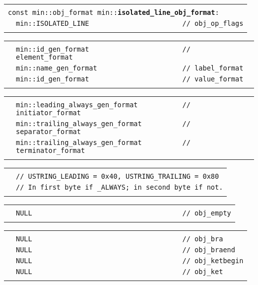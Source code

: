 \documentclass[12pt]{article}
\makeatletter
\newcommand{\TT}[1]{{\tt \bfseries #1}}
\newcommand{\ttindex}[1]{\index{#1@{\tt #1}}}
\newenvironment{indpar}[1][0.3in]%
	{\begin{list}{}%
		     {\setlength{\itemsep}{0in}%
		      \setlength{\topsep}{0in}%
		      \setlength{\parsep}{1ex}%
		      \setlength{\labelwidth}{#1}%
		      \setlength{\leftmargin}{#1}%
		      \addtolength{\leftmargin}{\labelsep}}%
	 \item}%
	{\end{list}}
\newcommand{\LABEL}[1]{\label{#1}}
\newlength{\ARGBREAKLENGTH}
\newcommand{\ARGBREAK}[1][\ARGBREAKLENGTH]{\\&\hspace*{#1}}
\newcommand{\MINKEY}[1]%
	   {\TT{#1}\ttindex{min::#1}\ttindex{#1}}
\makeatother
\begin{document}
\begin{indpar}[1em]
\begin{tabular}{r@{}l}\hspace*{0.1in} \\[-3ex]
\multicolumn{2}{l}{\tt const min::obj\_format
                   min::\MINKEY{isolated\_line\_obj\_format}:}%
\LABEL{MIN::ISOLATED_LINE_OBJ_FORMAT}\ARGBREAK
\verb|min::ISOLATED_LINE                       // obj_op_flags|\ARGBREAK
\end{tabular}

\vspace{-4ex}\begin{tabular}{r@{}l}\hspace*{0.1in}\ARGBREAK
\verb|min::id_gen_format                       // element_format|\ARGBREAK
\verb|min::name_gen_format                     // label_format|\ARGBREAK
\verb|min::id_gen_format                       // value_format|\ARGBREAK
\end{tabular}

\vspace{-4ex}\begin{tabular}{r@{}l}\hspace*{0.1in}\ARGBREAK
\verb|min::leading_always_gen_format           // initiator_format|\ARGBREAK
\verb|min::trailing_always_gen_format          // separator_format|\ARGBREAK
\verb|min::trailing_always_gen_format          // terminator_format|\ARGBREAK
\end{tabular}

\vspace{-4ex}\begin{tabular}{r@{}l}\hspace*{0.1in}\ARGBREAK
\verb|// USTRING_LEADING = 0x40, USTRING_TRAILING = 0x80|\ARGBREAK
\verb|// In first byte if _ALWAYS; in second byte if not.|\ARGBREAK
\end{tabular}

\vspace{-4ex}\begin{tabular}{r@{}l}\hspace*{0.1in}\ARGBREAK
\verb|NULL                                     // obj_empty|\ARGBREAK
\end{tabular}

\vspace{-4ex}\begin{tabular}{r@{}l}\hspace*{0.1in}\ARGBREAK
\verb|NULL                                     // obj_bra|\ARGBREAK
\verb|NULL                                     // obj_braend|\ARGBREAK
\verb|NULL                                     // obj_ketbegin|\ARGBREAK
\verb|NULL                                     // obj_ket|\ARGBREAK
\end{tabular}


\end{indpar}
\end{document}
